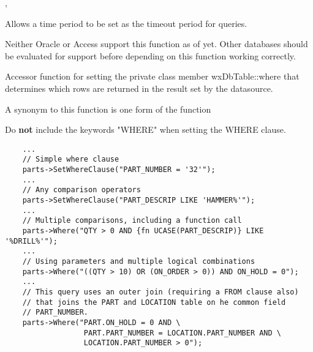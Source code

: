 
,

\label{wxdbtablesetquerytimeout}


Allows a time period to be set as the timeout period for queries.




Neither Oracle or Access support this function as of yet.  Other databases
should be evaluated for support before depending on this function working
correctly.

\label{wxdbtablesetwhereclause}


Accessor function for setting the private class member wxDbTable::where
that determines which rows are returned in the result set by the datasource.

A synonym to this function is one form of the function 




Do {\bf not} include the keywords "WHERE" when setting the WHERE clause.


\begin{verbatim}
    ...
    // Simple where clause
    parts->SetWhereClause("PART_NUMBER = '32'");
    ...
    // Any comparison operators
    parts->SetWhereClause("PART_DESCRIP LIKE 'HAMMER%'");
    ...
    // Multiple comparisons, including a function call
    parts->Where("QTY > 0 AND {fn UCASE(PART_DESCRIP)} LIKE '%DRILL%'");
    ...
    // Using parameters and multiple logical combinations
    parts->Where("((QTY > 10) OR (ON_ORDER > 0)) AND ON_HOLD = 0");
    ...
    // This query uses an outer join (requiring a FROM clause also)
    // that joins the PART and LOCATION table on he common field
    // PART_NUMBER.
    parts->Where("PART.ON_HOLD = 0 AND \
                  PART.PART_NUMBER = LOCATION.PART_NUMBER AND \
                  LOCATION.PART_NUMBER > 0");
\end{verbatim}

